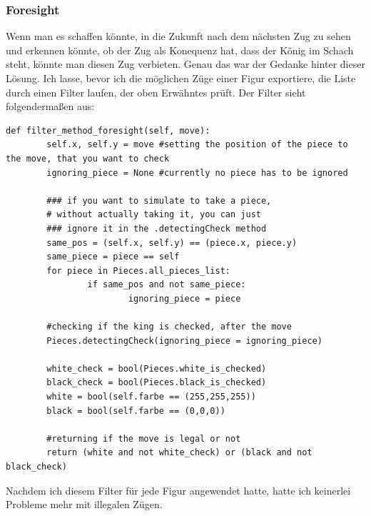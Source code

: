 \documentclass[a4paper, 10pt]{scrartcl}
\begin{document}
\subsubsection{Foresight}
Wenn man es schaffen könnte, in die Zukunft nach dem nächsten Zug zu sehen und erkennen könnte, ob
der Zug als Konequenz hat, dass der König im Schach steht, könnte man diesen Zug verbieten. 
Genau das war der Gedanke hinter dieser Lösung. Ich lasse, bevor ich die möglichen Züge
einer Figur exportiere, die Liste durch einen Filter laufen, der oben Erwähntes prüft.
Der Filter sieht folgendermaßen aus:

\begin{lstlisting}
def filter_method_foresight(self, move):
        self.x, self.y = move #setting the position of the piece to the move, that you want to check
        ignoring_piece = None #currently no piece has to be ignored

        ### if you want to simulate to take a piece, 
        # without actually taking it, you can just 
        ### ignore it in the .detectingCheck method
        same_pos = (self.x, self.y) == (piece.x, piece.y)
        same_piece = piece == self
        for piece in Pieces.all_pieces_list:
                if same_pos and not same_piece:
                        ignoring_piece = piece

        #checking if the king is checked, after the move
        Pieces.detectingCheck(ignoring_piece = ignoring_piece)

        white_check = bool(Pieces.white_is_checked)
        black_check = bool(Pieces.black_is_checked)
        white = bool(self.farbe == (255,255,255))
        black = bool(self.farbe == (0,0,0))

        #returning if the move is legal or not
        return (white and not white_check) or (black and not black_check)
\end{lstlisting}

Nachdem ich diesem Filter für jede Figur angewendet hatte, hatte ich keinerlei Probleme mehr mit
illegalen Zügen. 
\end{document}

